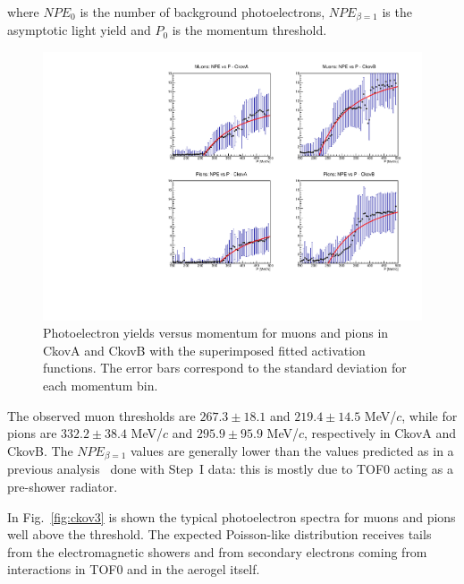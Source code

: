 where $NPE_0$ is the number of background photoelectrons, $NPE_{\beta=1}$ is the asymptotic light yield and $P_0$ is the momentum threshold.

\begin{figure}[htb!]
  \begin{center}
    \includegraphics[width=0.85\columnwidth]{./03-Ckov/Figures/Ckov_photoelectrons_vs_P.pdf}
    \caption{Photoelectron yields versus momentum for muons and pions in CkovA and CkovB with the superimposed fitted activation functions. The error bars correspond to the standard deviation for each momentum bin.}
    \label{fig:ckov2}
  \end{center}
\end{figure}

The observed muon thresholds are $267.3\pm18.1$ and $219.4\pm14.5$ MeV/$c$, while for pions are $332.2\pm38.4$ MeV/$c$ and $295.9\pm95.9$ MeV/$c$, respectively in CkovA and CkovB. The $NPE_{\beta=1}$ values are generally lower than the values predicted as in a previous analysis~\cite{NOTE473} done with Step~I data: this is mostly due to TOF0 acting as a pre-shower radiator.

In Fig.~\ref{fig:ckov3} is shown the typical photoelectron spectra for muons and pions well above the threshold. The expected Poisson-like distribution receives tails from the electromagnetic showers and from secondary electrons coming from interactions in TOF0 and in the aerogel itself.

